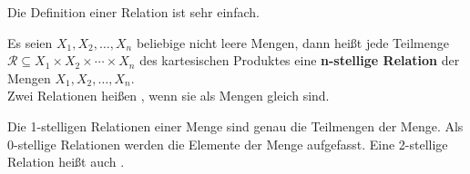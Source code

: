 \begin{Unit}
Die Definition einer Relation ist sehr einfach.

\begin{Definition}
  Es seien $X_1, X_2, \ldots , X_n$ beliebige nicht leere Mengen, dann heißt 
  jede Teilmenge $\mathcal{R} \subseteq X_1 \times X_2 \times \cdots \times 
  X_n$ des kartesischen Produktes eine \textbf{n-stellige Relation}
   der Mengen $X_1, X_2, \ldots , X_n$. \\
  Zwei Relationen heißen , wenn sie als Mengen gleich sind.
\end{Definition}

Die 1-stelligen Relationen einer Menge sind genau die Teilmengen der Menge. 
Als 0-stellige Relationen werden die Elemente der Menge aufgefasst. Eine 
2-stellige Relation heißt auch .
\end{Unit}

